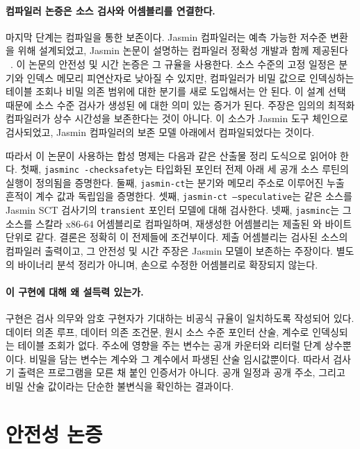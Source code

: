 \documentclass[10pt,twocolumn]{article}
\newcommand{\jasmin}{Jasmin}
\begin{document}
\paragraph{컴파일러 논증은 소스 검사와 어셈블리를 연결한다.}
마지막 단계는 컴파일을 통한 보존이다. \jasmin{} 컴파일러는 예측 가능한
저수준 변환을 위해 설계되었고, \jasmin{} 논문이 설명하는 컴파일러
정확성 개발과 함께 제공된다
~\cite{Jasmin2017,LastMile2020,JasminFramework2026}. 이 논문의 안전성 및
시간 논증은 그 규율을 사용한다. 소스 수준의 고정 일정은 분기와 인덱스
메모리 피연산자로 낮아질 수 있지만, 컴파일러가 비밀 값으로 인덱싱하는
테이블 조회나 비밀 의존 범위에 대한 분기를 새로 도입해서는 안 된다.
이 설계 선택 때문에 소스 수준 검사가 생성된 에 대한
의미 있는 증거가 된다. 주장은 임의의 최적화 컴파일러가 상수 시간성을 보존한다는
것이 아니다. 이 소스가 \jasmin{} 도구 체인으로 검사되었고, \jasmin{}
컴파일러의 보존 모델 아래에서 컴파일되었다는 것이다.

따라서 이 논문이 사용하는 합성 명제는 다음과 같은 산출물 정리 도식으로
읽어야 한다. 첫째, \texttt{jasminc -checksafety}는 타입화된 포인터
전제 아래 세 공개 소스 루틴의 실행이 정의됨을 증명한다. 둘째,
\texttt{jasmin-ct}는 분기와 메모리 주소로 이루어진 누출 흔적이 계수
값과 독립임을 증명한다. 셋째, \texttt{jasmin-ct --speculative}는 같은
소스를 \jasmin{} SCT 검사기의 \texttt{transient} 포인터 모델에 대해 검사한다.
넷째, \texttt{jasminc}는 그 소스를 스칼라 x86-64 어셈블리로 컴파일하며,
재생성한 어셈블리는 제출된 와 바이트 단위로 같다.
결론은 정확히 이 전제들에 조건부이다. 제출 어셈블리는 검사된 소스의
컴파일러 출력이고, 그 안전성 및 시간 주장은 \jasmin{} 모델이 보존하는
주장이다. 별도의 바이너리 분석 정리가 아니며, 손으로 수정한 어셈블리로
확장되지 않는다.

\paragraph{이 구현에 대해 왜 설득력 있는가.}
구현은 검사 의무와 암호 구현자가 기대하는 비공식 규율이 일치하도록
작성되어 있다. 데이터 의존 루프, 데이터 의존 조건문, 원시 소스 수준
포인터 산술, 계수로 인덱싱되는 테이블 조회가 없다. 주소에 영향을 주는
변수는 공개 카운터와 리터럴 단계 상수뿐이다. 비밀을 담는 변수는 계수와
그 계수에서 파생된 산술 임시값뿐이다. 따라서 검사기 출력은 프로그램을 모른 채 붙인 인증서가 아니다. 공개 일정과 공개 주소,
그리고 비밀 산술 값이라는 단순한 불변식을 확인하는 결과이다.

\section{안전성 논증}
\end{document}
